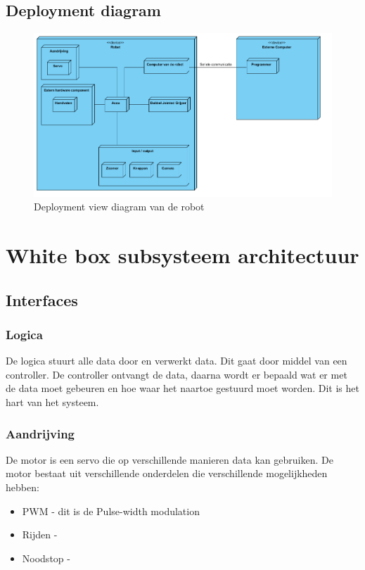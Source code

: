 \documentclass[12pt]{article} %
\begin{document}
\subsection{Deployment diagram}
\begin{center}
\begin{figure}[h]
\includegraphics[scale=.65]{deployment.png}
\caption{Deployment view diagram van de robot}
\label{fig:deployment}
\end{figure}
\end{center}
\clearpage
\newpage%
\section{White box subsysteem architectuur}
\label{sec:conclusion}

\subsection{Interfaces}
\subsubsection{Logica}
De logica stuurt alle data door en verwerkt data. Dit gaat door middel van een controller. De controller ontvangt de data, daarna wordt er bepaald wat er met de data moet gebeuren en hoe waar het naartoe gestuurd moet worden. Dit is het hart van het systeem.
\subsubsection{Aandrijving}
De motor is een servo die op verschillende manieren data kan gebruiken. De motor bestaat uit verschillende onderdelen die verschillende mogelijkheden hebben:
\begin{itemize}
\item PWM - dit is de Pulse-width modulation
\item Rijden -
\item Noodstop - 
\end{itemize}
\end{document}
